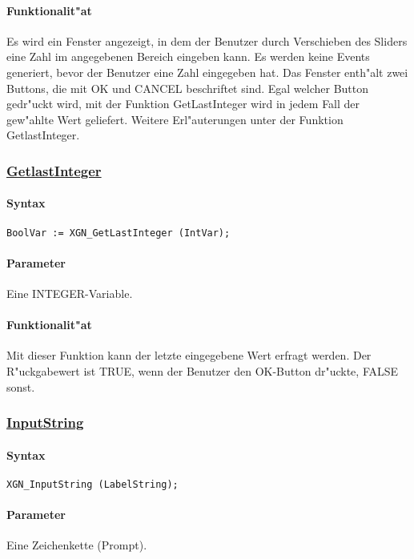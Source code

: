 \paragraph{Funktionalit"at}
Es wird ein Fenster angezeigt, in dem der Benutzer durch Verschieben
des Sliders eine Zahl im angegebenen Bereich eingeben kann. Es werden
keine Events generiert, bevor der Benutzer eine Zahl eingegeben hat.
Das Fenster enth"alt zwei Buttons, die mit OK und CANCEL beschriftet
sind. Egal welcher Button gedr"uckt wird, mit der Funktion GetLastInteger
wird in jedem Fall der gew"ahlte Wert geliefert. Weitere Erl"auterungen
unter der Funktion GetlastInteger.


\subsubsection{\underline{GetlastInteger}}

\paragraph{Syntax}
\begin{verbatim}
BoolVar := XGN_GetLastInteger (IntVar);
\end{verbatim}

\paragraph{Parameter}
Eine INTEGER-Variable.


\paragraph{Funktionalit"at}
Mit dieser Funktion kann der letzte eingegebene Wert erfragt werden.
Der R"uckgabewert ist TRUE, wenn der Benutzer den OK-Button dr"uckte,
FALSE sonst.

\subsubsection{\underline{InputString}}

\paragraph{Syntax}
\begin{verbatim}
XGN_InputString (LabelString);
\end{verbatim}

\paragraph{Parameter}
Eine Zeichenkette (Prompt).

